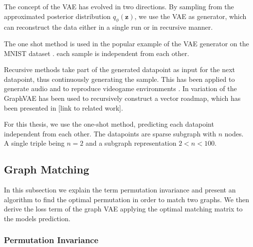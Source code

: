 {%




The concept of the VAE has evolved in two directions. By sampling from the approximated posterior distribution $q_{\phi}\left(\mathbf{z}\right)$, we use the VAE as generator, which can reconstruct the data either in a single run or in recursive manner.

The one shot method is used in the popular example of the VAE generator on the MNIST dataset \cite{kingma_auto-encoding_2014}. each sample is independent from each other.

Recursive methods take part of the generated datapoint as input for the next datapoint, thus continuously generating the sample. This has been applied to generate audio and to reproduce videogame environments \cite{ha_world_2018}. In \cite{belli_image-conditioned_2019} variation of the GraphVAE has been used to recursively construct a vector roadmap, which has been presented in [link to related work].

For this thesis, we use the one-shot method, predicting each datapoint independent from each other. The datapoints are sparse subgraph with $n$ nodes. A single triple being $n=2$ and a subgraph representation $2<n<100$. 

\subsection{Graph Matching}
\label{ssec:graphmatch}
In this subsection we explain the term permutation invariance and present an algorithm to find the optimal permutation in order to match two graphs. We then derive the loss term of the graph VAE applying the optimal matching matrix to the models prediction.

\subsubsection{Permutation Invariance}

}
